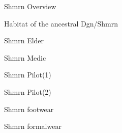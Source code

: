\begin{figure}
\begin{center}
    \caption{Shmrn Overview}
    \label{fig:Shmrn-overview}
\end{center}
\end{figure}
\begin{figure}
\begin{center}
    \caption{Habitat of the ancestral Dgn/Shmrn}
    \label{fig:Shmrn-ancestral}
\end{center}
\end{figure}
\begin{figure}
\begin{center}
    \caption{Shmrn Elder}
    \label{fig:Shmrn-elder}
\end{center}
\end{figure}
\begin{figure}
\begin{center}
    \caption{Shmrn Medic}
    \label{fig:Shmrn-medic}
\end{center}
\end{figure}
\begin{figure}
\begin{center}
    \caption{Shmrn Pilot(1)}
    \label{fig:Shmrn-pilot}
\end{center}
\end{figure}
\begin{figure}
\begin{center}
    \caption{Shmrn Pilot(2)}
    \label{fig:Shmrn-pilot1}
\end{center}
\end{figure}
\begin{figure}
\begin{center}
    \caption{Shmrn footwear}
    \label{fig:Shmrn-footwear}
\end{center}
\end{figure}
\begin{figure}
\begin{center}
    \caption{Shmrn formalwear}
    \label{fig:Shmrn-formalwear}
\end{center}
\end{figure}

